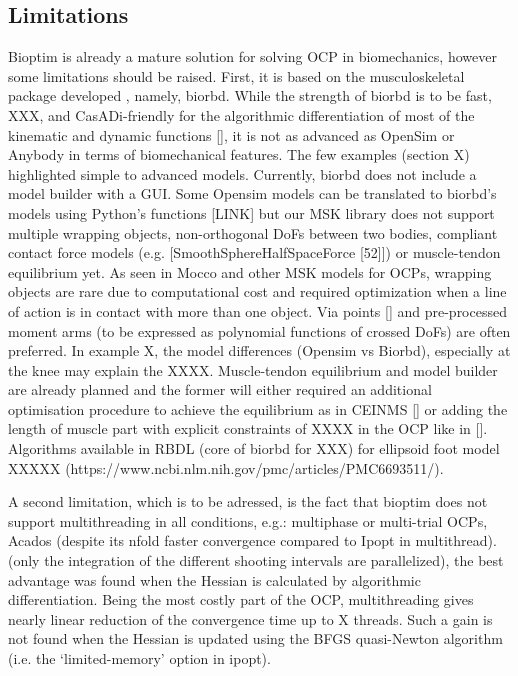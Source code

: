 \subsection{Limitations}

Bioptim is already a mature solution for solving OCP in biomechanics, however some limitations should be raised. 
First, it is based on the musculoskeletal package developed , namely, biorbd. 
While the strength of biorbd is to be fast, XXX, and CasADi-friendly for the algorithmic differentiation of most of the kinematic and dynamic functions [\addref], it is not as advanced as OpenSim or Anybody in terms of biomechanical features. 
The few examples (section X) highlighted simple to advanced models.
Currently, biorbd does not include a model builder with a GUI. 
Some Opensim models can be translated to biorbd’s models using Python’s functions [LINK] but our MSK library does not support multiple wrapping objects, non-orthogonal DoFs between two bodies, compliant contact force models (e.g. [SmoothSphereHalfSpaceForce [52]]) or muscle-tendon equilibrium yet. 
As seen in Mocco and other MSK models for OCPs, wrapping objects are rare due to computational cost and required optimization when a line of action is in contact with more than one object. 
Via points [\addref] and pre-processed moment arms (to be expressed as polynomial functions of crossed DoFs) are often preferred. 
In example X, the model differences (Opensim vs Biorbd), especially at the knee may explain the XXXX. 
Muscle-tendon equilibrium and model builder are already planned and the former will either required an additional optimisation procedure to achieve the equilibrium as in CEINMS [\addref] or adding the length of muscle part with explicit constraints of XXXX in the OCP like in [\addref]. 
Algorithms available in RBDL (core of biorbd for XXX) for ellipsoid foot model XXXXX (https://www.ncbi.nlm.nih.gov/pmc/articles/PMC6693511/).  

A second limitation, which is to be adressed, is the fact that bioptim does not support multithreading in all conditions, e.g.: multiphase or multi-trial OCPs, Acados (despite its nfold faster convergence compared to Ipopt in multithread). 
 (only the integration of the different shooting intervals are parallelized), the best advantage was found when the Hessian is calculated by algorithmic differentiation. 
Being the most costly part of the OCP, multithreading gives nearly linear reduction of the convergence time up to X threads. 
Such a gain is not found when the Hessian is updated using the BFGS quasi-Newton algorithm (i.e. the ‘limited-memory’ option in ipopt).  

